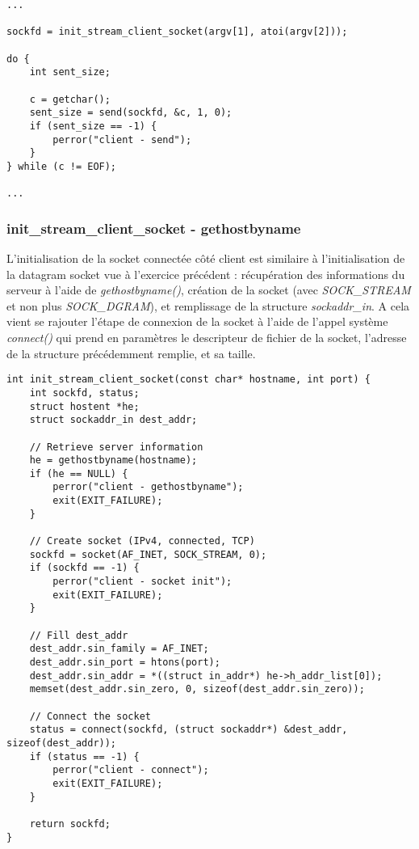 \documentclass[a4paper, frenchb, 11pt]{article}
\begin{document}
\begin{lstlisting}
...

sockfd = init_stream_client_socket(argv[1], atoi(argv[2]));

do {
    int sent_size;

    c = getchar();
    sent_size = send(sockfd, &c, 1, 0);
    if (sent_size == -1) {
        perror("client - send");
    }
} while (c != EOF);

...
\end{lstlisting}

\subsubsection{init\_stream\_client\_socket - gethostbyname}
L'initialisation de la socket connectée côté client est similaire à l'initialisation de la datagram socket vue à l'exercice précédent : récupération des informations du serveur à l'aide de \emph{gethostbyname()}, création de la socket (avec \emph{SOCK\_STREAM} et non plus \emph{SOCK\_DGRAM}), et remplissage de la structure \emph{sockaddr\_in}. A cela vient se rajouter l'étape de connexion de la socket à l'aide de l'appel système \emph{connect()} qui prend en paramètres le descripteur de fichier de la socket, l'adresse de la structure précédemment remplie, et sa taille.\\

\begin{lstlisting}
int init_stream_client_socket(const char* hostname, int port) {
    int sockfd, status;
    struct hostent *he;
    struct sockaddr_in dest_addr;

    // Retrieve server information
    he = gethostbyname(hostname);
    if (he == NULL) {
        perror("client - gethostbyname");
        exit(EXIT_FAILURE);
    }

    // Create socket (IPv4, connected, TCP)
    sockfd = socket(AF_INET, SOCK_STREAM, 0);
    if (sockfd == -1) {
        perror("client - socket init");
        exit(EXIT_FAILURE);
    }

    // Fill dest_addr
    dest_addr.sin_family = AF_INET;
    dest_addr.sin_port = htons(port);
    dest_addr.sin_addr = *((struct in_addr*) he->h_addr_list[0]);
    memset(dest_addr.sin_zero, 0, sizeof(dest_addr.sin_zero));

    // Connect the socket
    status = connect(sockfd, (struct sockaddr*) &dest_addr, sizeof(dest_addr));
    if (status == -1) {
        perror("client - connect");
        exit(EXIT_FAILURE);
    }

    return sockfd;
}
\end{lstlisting}
\end{document}
